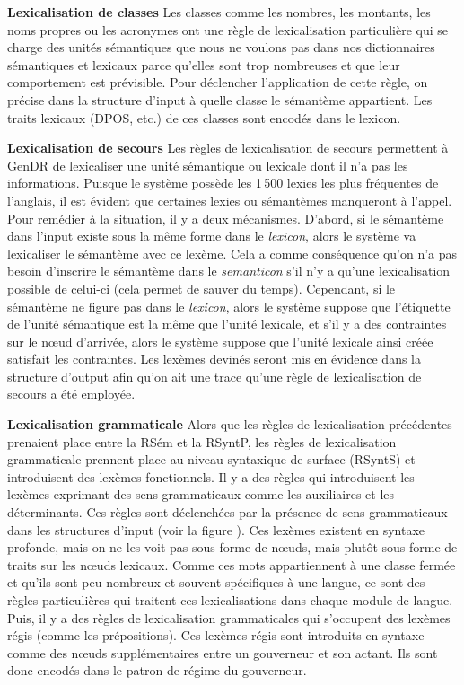 \textbf{Lexicalisation de classes}
Les classes comme les nombres, les montants, les noms propres ou les acronymes ont une règle de lexicalisation particulière qui se charge des unités sémantiques que nous ne voulons pas dans nos dictionnaires sémantiques et lexicaux parce qu'elles sont trop nombreuses et que leur comportement est prévisible. Pour déclencher l'application de cette règle, on précise dans la structure d'input à quelle classe le sémantème appartient. Les traits lexicaux (DPOS, etc.) de ces classes sont encodés dans le lexicon.

\textbf{Lexicalisation de secours}
Les règles de lexicalisation de secours permettent à GenDR de lexicaliser une unité sémantique ou lexicale dont il n'a pas les informations. Puisque le système possède les 1\,500 lexies les plus fréquentes de l'anglais, il est évident que certaines lexies ou sémantèmes manqueront à l'appel. Pour remédier à la situation, il y a deux mécanismes. D'abord, si le sémantème dans l'input existe sous la même forme dans le \emph{lexicon}, alors le système va lexicaliser le sémantème avec ce lexème. Cela a comme conséquence qu'on n'a pas besoin d'inscrire le sémantème dans le \emph{semanticon} s'il n'y a qu'une lexicalisation possible de celui-ci (cela permet de sauver du temps). Cependant, si le sémantème ne figure pas dans le \emph{lexicon}, alors le système suppose que l'étiquette de l'unité sémantique est la même que l'unité lexicale, et s'il y a des contraintes sur le n\oe{}ud d'arrivée, alors le système suppose que l'unité lexicale ainsi créée satisfait les contraintes. Les lexèmes devinés seront mis en évidence dans la structure d'output afin qu'on ait une trace qu'une règle de lexicalisation de secours a été employée.

	
\textbf{Lexicalisation grammaticale}
Alors que les règles de lexicalisation précédentes prenaient place entre la RSém et la RSyntP, les règles de lexicalisation grammaticale prennent place au niveau syntaxique de surface (RSyntS) et introduisent des lexèmes fonctionnels. Il y a des règles qui introduisent les lexèmes exprimant des sens grammaticaux comme les auxiliaires et les déterminants. Ces règles sont déclenchées par la présence de sens grammaticaux dans les structures d'input (voir la figure ). Ces lexèmes existent en syntaxe profonde, mais on ne les voit pas sous forme de n\oe{}uds, mais plutôt sous forme de traits sur les n\oe{}uds lexicaux. Comme ces mots appartiennent à une classe fermée et qu'ils sont peu nombreux et souvent spécifiques à une langue, ce sont des règles particulières qui traitent ces lexicalisations dans chaque module de langue. Puis, il y a des règles de lexicalisation grammaticales qui s'occupent des lexèmes régis (comme les prépositions). Ces lexèmes régis sont introduits en syntaxe comme des n\oe{}uds supplémentaires entre un gouverneur et son actant. Ils sont donc encodés dans le patron de régime du gouverneur.


